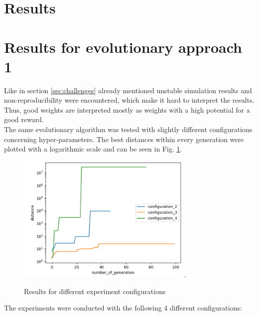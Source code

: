 \section{Results}
\label{sec:results}

\section{Results for evolutionary approach 1}
\label{sec:results_1}

Like in section \ref{sec:challenges} already mentioned unstable simulation results and non-reproducibility were encountered, which make it hard to interpret the results. Thus, good weights are interpreted mostly as weights with a high potential for a good reward.\\
The same evolutionary algorithm was tested with slightly different configurations concerning hyper-parameters. 
The best distances within every generation were plotted with a logarithmic scale and can be seen in Fig. \ref{fig:results_1}. 

\begin{figure}[H]
	\centering
	\includegraphics[width=3.3in]{img/results_1.png}
	\DeclareGraphicsExtensions.
	\caption{Results for different experiment configurations}
	\label{fig:results_1}
\end{figure}


The experiments were conducted with the following 4 different configurations:\\

